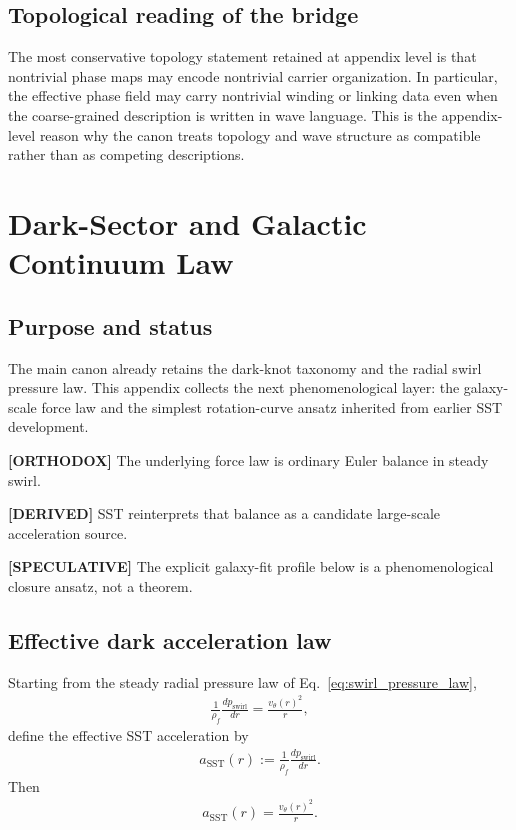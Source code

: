 \documentclass[11pt]{article}
\theoremstyle{definition}
\theoremstyle{plain}
\theoremstyle{remark}
\newcommand{\rhoF}{{\rho_{\!f}}}
\begin{document}
    \subsection{Topological reading of the bridge}
        The most conservative topology statement retained at appendix level is that nontrivial phase maps may encode nontrivial carrier organization. In particular, the effective phase field may carry nontrivial winding or linking data even when the coarse-grained description is written in wave language. This is the appendix-level reason why the canon treats topology and wave structure as compatible rather than as competing descriptions.
    
    \section{Dark-Sector and Galactic Continuum Law}
    \label{sec:appendix_dark_galactic}
    
    \subsection{Purpose and status}
        The main canon already retains the dark-knot taxonomy and the radial swirl pressure law. This appendix collects the next phenomenological layer: the galaxy-scale force law and the simplest rotation-curve ansatz inherited from earlier SST development.
        
        \textbf{[ORTHODOX]} The underlying force law is ordinary Euler balance in steady swirl.
        
        \textbf{[DERIVED]} SST reinterprets that balance as a candidate large-scale acceleration source.
        
        \textbf{[SPECULATIVE]} The explicit galaxy-fit profile below is a phenomenological closure ansatz, not a theorem.
    
    \subsection{Effective dark acceleration law}
        Starting from the steady radial pressure law of Eq.~\eqref{eq:swirl_pressure_law},
        \begin{align}
            \frac{1}{\rhoF}\frac{dp_{\mathrm{swirl}}}{dr}
            =
            \frac{v_\theta(r)^2}{r},
        \end{align}
        define the effective SST acceleration by
        \begin{align}
            a_{\mathrm{SST}}(r)
            :=
            \frac{1}{\rhoF}\frac{dp_{\mathrm{swirl}}}{dr}.
            \label{eq:appendix_dark_accel}
        \end{align}
        Then
        \begin{align}
            a_{\mathrm{SST}}(r)=\frac{v_\theta(r)^2}{r}.
            \label{eq:appendix_dark_accel_v2r}
        \end{align}
        
\end{document}
